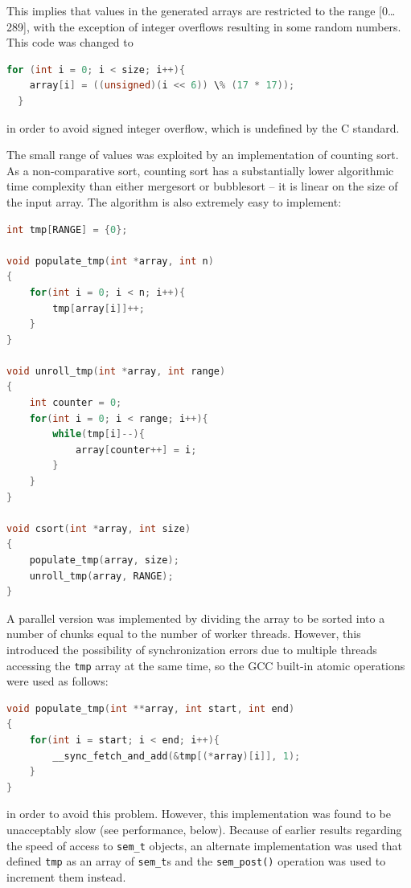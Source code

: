 \documentclass{article}
\begin{document}
This implies that values in the generated arrays are restricted to the
range [0\ldots289], with the exception of integer overflows resulting
in some random numbers. This code was changed to
\begin{lstlisting}[language=C]
  for (int i = 0; i < size; i++){ 
    array[i] = ((unsigned)(i << 6)) \% (17 * 17));
  }
\end{lstlisting}

in order to avoid signed integer overflow, which is undefined by the C
standard. 

The small range of values was exploited by an implementation of
counting sort. As a non-comparative sort, counting sort has a
substantially lower algorithmic time complexity than either mergesort
or bubblesort -- it is linear on the size of the input array. The
algorithm is also extremely easy to implement:

\begin{lstlisting}[language=C]
int tmp[RANGE] = {0}; 

void populate_tmp(int *array, int n)
{
	for(int i = 0; i < n; i++){
		tmp[array[i]]++;
	}
}

void unroll_tmp(int *array, int range)
{
	int counter = 0;
	for(int i = 0; i < range; i++){
		while(tmp[i]--){
			array[counter++] = i;
		}
	}
}

void csort(int *array, int size)
{
	populate_tmp(array, size);
	unroll_tmp(array, RANGE);
}
\end{lstlisting}

A parallel version was implemented by dividing the array to be sorted
into a number of chunks equal to the number of worker
threads. However, this introduced the possibility of synchronization
errors due to multiple threads accessing the \texttt{tmp} array at the
same time, so the GCC built-in atomic operations were used as follows: 

\begin{lstlisting}[language=C]
void populate_tmp(int **array, int start, int end)
{
	for(int i = start; i < end; i++){
		__sync_fetch_and_add(&tmp[(*array)[i]], 1);
	}
}
\end{lstlisting}

in order to avoid this problem. However, this implementation was found
to be unacceptably slow (see performance, below). Because of earlier results regarding the
speed of access to \texttt{sem\_t} objects, an alternate
implementation was used that defined \texttt{tmp} as an array of
\texttt{sem\_t}s and the \texttt{sem\_post()} operation was used to
increment them instead. 
\end{document}
